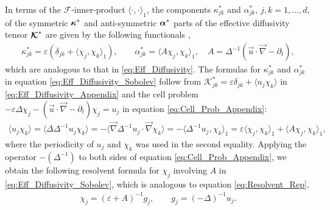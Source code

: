 \documentclass[11pt]{amsart}
\newcommand{\Kc}{\mathcal{K}}
\newcommand\Kbc{\mbox{\boldmath${\mathcal{K}}$}}
\newcommand{\Fc}{\mathcal{F}}
\newcommand\balpha{\mbox{\boldmath${\alpha}$}}
\newcommand\bkappa{\mbox{\boldmath${\kappa}$}}
\begin{document}
In terms of the $\Fc$-inner-product $\langle\cdot,\cdot\rangle_1$, the components
$\kappa^*_{jk}$ and $\alpha^*_{jk}$, $j,k=1,\ldots,d$, of the symmetric $\bkappa^*$
and anti-symmetric $\balpha^*$ parts of the effective diffusivity
tensor $\Kbc^*$ are given by the following functionals 
\cite{Pavliotis:PHD_Thesis},   
%
\begin{align}\label{eq:Eff_Diffusivity_Sobolev}
  \kappa^*_{jk}=\varepsilon(\delta_{jk}+\langle\chi_j,\chi_k\rangle_1), \qquad
  \alpha^*_{jk}=\langle A\chi_j,\chi_k\rangle_1, \quad
  A=\Delta^{-1}(\vec{u}\cdot\vec{\nabla}-\partial_t),
\end{align}
%
which are analogous to that in \eqref{eq:Eff_Diffusivity}.
The formulas for $\kappa^*_{jk}$ and $\alpha^*_{jk}$ in equation
\eqref{eq:Eff_Diffusivity_Sobolev} follow \cite{Pavliotis:PHD_Thesis}
from $\Kc^*_{jk}=\varepsilon\delta_{jk}+\langle u_j\chi_k\rangle$ in
\eqref{eq:Eff_Diffusivity_Appendix} and the cell problem
$-\varepsilon\Delta\chi_j-(\vec{u}\cdot\vec{\nabla}-\partial_t)\chi_j=u_j$ in equation
\eqref{eq:Cell_Prob_Appendix}: 
%
\begin{align}
  \langle u_j\chi_k\rangle=\langle\Delta\Delta^{-1}u_j\chi_k\rangle
       =-\langle\vec{\nabla}\Delta^{-1}u_j\cdot\vec{\nabla}\chi_k\rangle
       =-\langle\Delta^{-1}u_j,\chi_k\rangle_1
       =\varepsilon\langle\chi_j,\chi_k\rangle_1+\langle A\chi_j,\chi_k\rangle_1,
\end{align}
%
where the periodicity of $u_j$ and $\chi_k$ was used in the second equality.
Applying the operator $-(\Delta^{-1})$ to both sides of equation
\eqref{eq:Cell_Prob_Appendix}, we obtain the following resolvent
formula for $\chi_j$ involving $A$ in \eqref{eq:Eff_Diffusivity_Sobolev},
which is analogous to equation \eqref{eq:Resolvent_Rep},   
%
\begin{align}\label{eq:Resolvent_Rep_Scalar}
  \chi_j=(\varepsilon+A)^{-1}g_j, \qquad 
  g_j=(-\Delta)^{-1}u_j.
\end{align}
%
\end{document}

